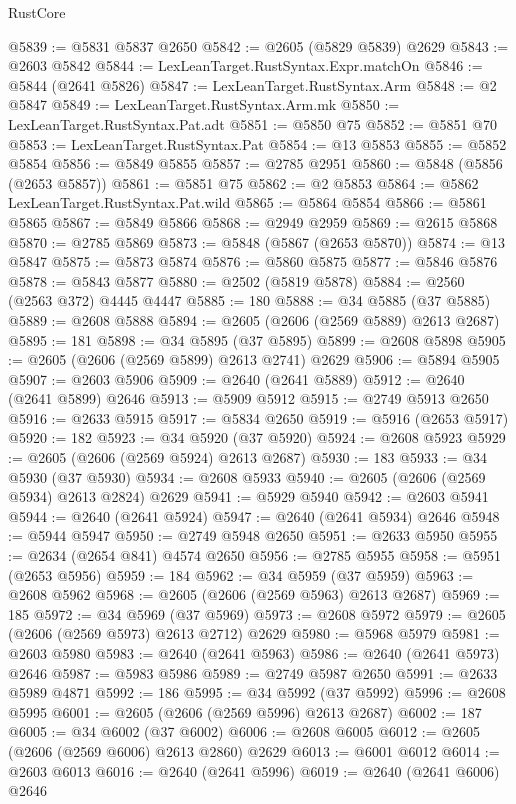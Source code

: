 \begin{lexlean}{RustCore}
\begin{coremodule}
@5839 := @5831 @5837 @2650
@5842 := @2605 (@5829 @5839) @2629
@5843 := @2603 @5842
@5844 := LexLeanTarget.RustSyntax.Expr.matchOn
@5846 := @5844 (@2641 @5826)
@5847 := LexLeanTarget.RustSyntax.Arm
@5848 := @2 @5847
@5849 := LexLeanTarget.RustSyntax.Arm.mk
@5850 := LexLeanTarget.RustSyntax.Pat.adt
@5851 := @5850 @75
@5852 := @5851 @70
@5853 := LexLeanTarget.RustSyntax.Pat
@5854 := @13 @5853
@5855 := @5852 @5854
@5856 := @5849 @5855
@5857 := @2785 @2951
@5860 := @5848 (@5856 (@2653 @5857))
@5861 := @5851 @75
@5862 := @2 @5853
@5864 := @5862 LexLeanTarget.RustSyntax.Pat.wild
@5865 := @5864 @5854
@5866 := @5861 @5865
@5867 := @5849 @5866
@5868 := @2949 @2959
@5869 := @2615 @5868
@5870 := @2785 @5869
@5873 := @5848 (@5867 (@2653 @5870))
@5874 := @13 @5847
@5875 := @5873 @5874
@5876 := @5860 @5875
@5877 := @5846 @5876
@5878 := @5843 @5877
@5880 := @2502 (@5819 @5878)
@5884 := @2560 (@2563 @372) @4445 @4447
@5885 := 180
@5888 := @34 @5885 (@37 @5885)
@5889 := @2608 @5888
@5894 := @2605 (@2606 (@2569 @5889) @2613 @2687)
@5895 := 181
@5898 := @34 @5895 (@37 @5895)
@5899 := @2608 @5898
@5905 := @2605 (@2606 (@2569 @5899) @2613 @2741) @2629
@5906 := @5894 @5905
@5907 := @2603 @5906
@5909 := @2640 (@2641 @5889)
@5912 := @2640 (@2641 @5899) @2646
@5913 := @5909 @5912
@5915 := @2749 @5913 @2650
@5916 := @2633 @5915
@5917 := @5834 @2650
@5919 := @5916 (@2653 @5917)
@5920 := 182
@5923 := @34 @5920 (@37 @5920)
@5924 := @2608 @5923
@5929 := @2605 (@2606 (@2569 @5924) @2613 @2687)
@5930 := 183
@5933 := @34 @5930 (@37 @5930)
@5934 := @2608 @5933
@5940 := @2605 (@2606 (@2569 @5934) @2613 @2824) @2629
@5941 := @5929 @5940
@5942 := @2603 @5941
@5944 := @2640 (@2641 @5924)
@5947 := @2640 (@2641 @5934) @2646
@5948 := @5944 @5947
@5950 := @2749 @5948 @2650
@5951 := @2633 @5950
@5955 := @2634 (@2654 @841) @4574 @2650
@5956 := @2785 @5955
@5958 := @5951 (@2653 @5956)
@5959 := 184
@5962 := @34 @5959 (@37 @5959)
@5963 := @2608 @5962
@5968 := @2605 (@2606 (@2569 @5963) @2613 @2687)
@5969 := 185
@5972 := @34 @5969 (@37 @5969)
@5973 := @2608 @5972
@5979 := @2605 (@2606 (@2569 @5973) @2613 @2712) @2629
@5980 := @5968 @5979
@5981 := @2603 @5980
@5983 := @2640 (@2641 @5963)
@5986 := @2640 (@2641 @5973) @2646
@5987 := @5983 @5986
@5989 := @2749 @5987 @2650
@5991 := @2633 @5989 @4871
@5992 := 186
@5995 := @34 @5992 (@37 @5992)
@5996 := @2608 @5995
@6001 := @2605 (@2606 (@2569 @5996) @2613 @2687)
@6002 := 187
@6005 := @34 @6002 (@37 @6002)
@6006 := @2608 @6005
@6012 := @2605 (@2606 (@2569 @6006) @2613 @2860) @2629
@6013 := @6001 @6012
@6014 := @2603 @6013
@6016 := @2640 (@2641 @5996)
@6019 := @2640 (@2641 @6006) @2646

\end{coremodule}
\end{lexlean}
